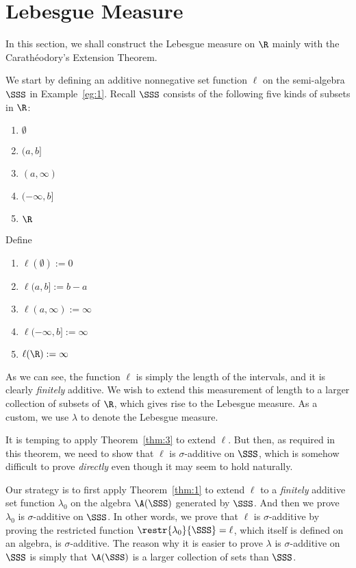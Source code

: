 \documentclass[thmcnt=section, 12pt]{elegantbook}
\begin{document}

\section{Lebesgue Measure}

\par In this section, we shall construct the Lebesgue measure on $\R$ mainly with the Carathéodory's Extension Theorem.


\par We start by defining an additive nonnegative set function $\ell$ on the semi-algebra $\SSS$ in Example~\ref{eg:1}. Recall $\SSS$ consists of the following five kinds of subsets in $\R$:
\begin{enumerate}
    \item $\emptyset$
    \item $(a, b]$
    \item $(a, \infty)$
    \item $(-\infty, b]$
    \item $\R$
\end{enumerate}
Define 
\begin{enumerate}
    \item $\ell(\emptyset) := 0$
    \item $\ell(a, b] := b-a$
    \item $\ell(a, \infty) := \infty$
    \item $\ell(-\infty, b] := \infty$
    \item $\ell(\R) := \infty$
\end{enumerate}

As we can see, the function $\ell$ is simply the length of the intervals, and it is clearly \textit{finitely} additive. We wish to extend this measurement of length to a larger collection of subsets of $\R$, which gives rise to the Lebesgue measure. As a custom, we use $\lambda$ to denote the Lebesgue measure. 


\par It is temping to apply Theorem~\ref{thm:3} to extend $\ell$. But then, as required in this theorem, we need to show that $\ell$ is $\sigma$-additive on $\SSS$, which is somehow difficult to prove \textit{directly} even though it may seem to hold naturally.

\par Our strategy is to first apply Theorem~\ref{thm:1} to extend $\ell$ to a \textit{finitely} additive set function $\lambda_0$ on the algebra $\A(\SSS)$ generated by $\SSS$. And then we prove $\lambda_0$ is $\sigma$-additive on $\SSS$. In other words, we prove that $\ell$ is $\sigma$-additive by proving the restricted function $\restr{\lambda_0}{\SSS} = \ell$, which itself is defined on an algebra, is $\sigma$-additive. The reason why it is easier to prove $\lambda$ is $\sigma$-additive on $\SSS$ is simply that $\A(\SSS)$ is a larger collection of sets than $\SSS$.
\end{document}
